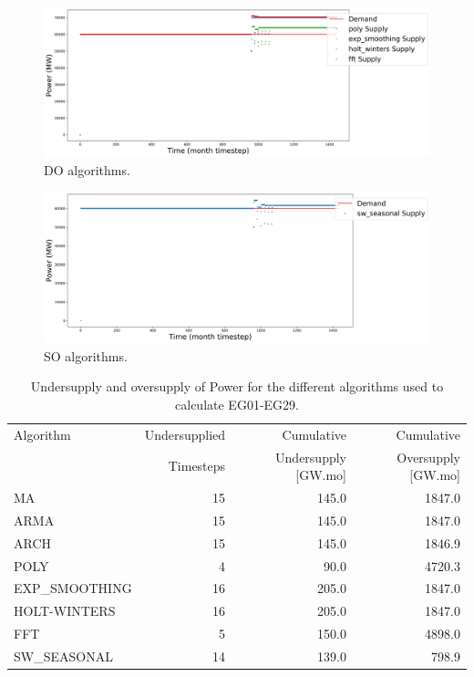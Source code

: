 \documentclass[11pt]{article}
\begin{document}
\begin{figure}[H]
	\centering
	\includegraphics[width=\textwidth]{29-figures/29-power0-buffer02.png} 
	\hfill
	\caption{DO algorithms.}
	\label{fig:29-DO}
\end{figure}

\begin{figure}[H]
	\centering
	\includegraphics[width=\textwidth]{29-figures/29-power0-buffer03.png} 
	\hfill
	\caption{SO algorithms.}
	\label{fig:29-SO}
\end{figure}

\begin{table}[H]
	\centering
	\caption{Undersupply and oversupply of Power for the different algorithms used to calculate EG01-EG29.}
	\label{tab:29-power}
	\begin{tabularx}{\textwidth}{lRRR}
		\hline
		Algorithm & Undersupplied & Cumulative  & Cumulative \\
		& Timesteps     & Undersupply [GW.mo]  & Oversupply [GW.mo] \\ \hline
		MA        & 15 	& 145.0 & 1847.0 \\ 
		ARMA      & 15 	& 145.0 & 1847.0 \\ 
		ARCH      & 15 	& 145.0 & 1846.9 \\ 
		POLY      &  4 	& 90.0 & 4720.3 \\ 
		EXP\_SMOOTHING 	& 16 & 205.0 & 1847.0 \\ 
		HOLT-WINTERS  	& 16 & 205.0 & 1847.0 \\ 
		FFT       &  5	& 150.0	& 4898.0 \\ 
		SW\_SEASONAL    & 14 & 139.0 & 798.9 \\ \hline
	\end{tabularx}
\end{table}
\end{document}
